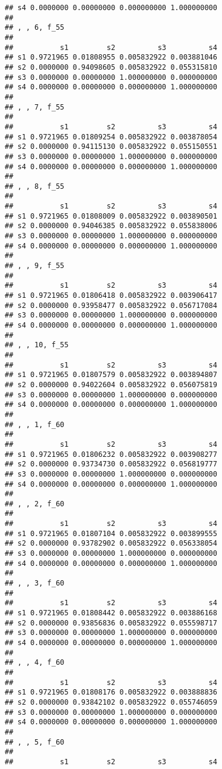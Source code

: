 \documentclass[
]{article}
\begin{document}
\begin{verbatim}
## s4 0.0000000 0.00000000 0.000000000 1.000000000
## 
## , , 6, f_55
## 
##           s1         s2          s3          s4
## s1 0.9721965 0.01808955 0.005832922 0.003881046
## s2 0.0000000 0.94098605 0.005832922 0.055315810
## s3 0.0000000 0.00000000 1.000000000 0.000000000
## s4 0.0000000 0.00000000 0.000000000 1.000000000
## 
## , , 7, f_55
## 
##           s1         s2          s3          s4
## s1 0.9721965 0.01809254 0.005832922 0.003878054
## s2 0.0000000 0.94115130 0.005832922 0.055150551
## s3 0.0000000 0.00000000 1.000000000 0.000000000
## s4 0.0000000 0.00000000 0.000000000 1.000000000
## 
## , , 8, f_55
## 
##           s1         s2          s3          s4
## s1 0.9721965 0.01808009 0.005832922 0.003890501
## s2 0.0000000 0.94046385 0.005832922 0.055838006
## s3 0.0000000 0.00000000 1.000000000 0.000000000
## s4 0.0000000 0.00000000 0.000000000 1.000000000
## 
## , , 9, f_55
## 
##           s1         s2          s3          s4
## s1 0.9721965 0.01806418 0.005832922 0.003906417
## s2 0.0000000 0.93958477 0.005832922 0.056717084
## s3 0.0000000 0.00000000 1.000000000 0.000000000
## s4 0.0000000 0.00000000 0.000000000 1.000000000
## 
## , , 10, f_55
## 
##           s1         s2          s3          s4
## s1 0.9721965 0.01807579 0.005832922 0.003894807
## s2 0.0000000 0.94022604 0.005832922 0.056075819
## s3 0.0000000 0.00000000 1.000000000 0.000000000
## s4 0.0000000 0.00000000 0.000000000 1.000000000
## 
## , , 1, f_60
## 
##           s1         s2          s3          s4
## s1 0.9721965 0.01806232 0.005832922 0.003908277
## s2 0.0000000 0.93734730 0.005832922 0.056819777
## s3 0.0000000 0.00000000 1.000000000 0.000000000
## s4 0.0000000 0.00000000 0.000000000 1.000000000
## 
## , , 2, f_60
## 
##           s1         s2          s3          s4
## s1 0.9721965 0.01807104 0.005832922 0.003899555
## s2 0.0000000 0.93782902 0.005832922 0.056338054
## s3 0.0000000 0.00000000 1.000000000 0.000000000
## s4 0.0000000 0.00000000 0.000000000 1.000000000
## 
## , , 3, f_60
## 
##           s1         s2          s3          s4
## s1 0.9721965 0.01808442 0.005832922 0.003886168
## s2 0.0000000 0.93856836 0.005832922 0.055598717
## s3 0.0000000 0.00000000 1.000000000 0.000000000
## s4 0.0000000 0.00000000 0.000000000 1.000000000
## 
## , , 4, f_60
## 
##           s1         s2          s3          s4
## s1 0.9721965 0.01808176 0.005832922 0.003888836
## s2 0.0000000 0.93842102 0.005832922 0.055746059
## s3 0.0000000 0.00000000 1.000000000 0.000000000
## s4 0.0000000 0.00000000 0.000000000 1.000000000
## 
## , , 5, f_60
## 
##           s1         s2          s3          s4

\end{verbatim}
\end{document}
